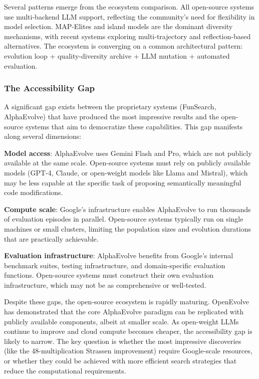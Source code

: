Several patterns emerge from the ecosystem comparison. All open-source systems use multi-backend LLM support, reflecting the community's need for flexibility in model selection. MAP-Elites and island models are the dominant diversity mechanisms, with recent systems exploring multi-trajectory and reflection-based alternatives. The ecosystem is converging on a common architectural pattern: evolution loop + quality-diversity archive + LLM mutation + automated evaluation.

\subsubsection{The Accessibility Gap}

A significant gap exists between the proprietary systems (FunSearch, AlphaEvolve) that have produced the most impressive results and the open-source systems that aim to democratize these capabilities. This gap manifests along several dimensions:

\textbf{Model access}: AlphaEvolve uses Gemini Flash and Pro, which are not publicly available at the same scale. Open-source systems must rely on publicly available models (GPT-4, Claude, or open-weight models like Llama and Mistral), which may be less capable at the specific task of proposing semantically meaningful code modifications.

\textbf{Compute scale}: Google's infrastructure enables AlphaEvolve to run thousands of evaluation episodes in parallel. Open-source systems typically run on single machines or small clusters, limiting the population sizes and evolution durations that are practically achievable.

\textbf{Evaluation infrastructure}: AlphaEvolve benefits from Google's internal benchmark suites, testing infrastructure, and domain-specific evaluation functions. Open-source systems must construct their own evaluation infrastructure, which may not be as comprehensive or well-tested.

Despite these gaps, the open-source ecosystem is rapidly maturing. OpenEvolve has demonstrated that the core AlphaEvolve paradigm can be replicated with publicly available components, albeit at smaller scale. As open-weight LLMs continue to improve and cloud compute becomes cheaper, the accessibility gap is likely to narrow. The key question is whether the most impressive discoveries (like the 48-multiplication Strassen improvement) require Google-scale resources, or whether they could be achieved with more efficient search strategies that reduce the computational requirements.

